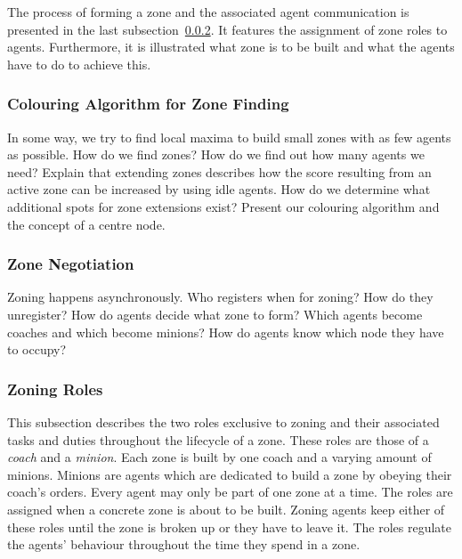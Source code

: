 The process of forming a zone and the associated agent communication is presented in the last subsection~\ref{alg:zon_formation}. It features the assignment of zone roles to agents. Furthermore, it is illustrated what zone is to be built and what the agents have to do to achieve this.

\subsubsection{Colouring Algorithm for Zone Finding}\label{alg:zon_colouring}
In some way, we try to find local maxima to build small zones with as few agents as possible. How do we find zones? How do we find out how many agents we need? Explain that extending zones describes how the score resulting from an active zone can be increased by using idle agents. How do we determine what additional spots for zone extensions exist?
Present our colouring algorithm and the concept of a centre node.


\subsubsection{Zone Negotiation}\label{alg:zon_formation}
Zoning happens asynchronously. Who registers when for zoning? How do they unregister?
How do agents decide what zone to form? Which agents become coaches and which become minions? How do agents know which node they have to occupy?

\subsubsection{Zoning Roles}\label{alg:zon_roles}
This subsection describes the two roles exclusive to zoning and their associated tasks and duties throughout the lifecycle of a zone. These roles are those of a \emph{coach} and a \emph{minion}. Each zone is built by one coach and a varying amount of minions. Minions are agents which are dedicated to build a zone by obeying their coach's orders. Every agent may only be part of one zone at a time. %
The roles are assigned when a concrete zone is about to be built. Zoning agents keep either of these roles until the zone is broken up or they have to leave it. The roles regulate the agents' behaviour throughout the time they spend in a zone.



